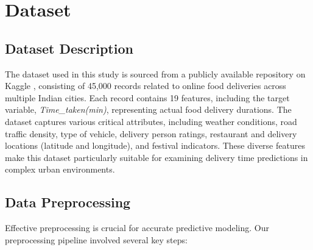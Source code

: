 \documentclass[10pt,twocolumn,letterpaper]{article}
\begin{document}
\section{Dataset}

\subsection{Dataset Description}
The dataset used in this study is sourced from a publicly available repository on Kaggle \cite{kaggle}, consisting of 45,000 records related to online food deliveries across multiple Indian cities. Each record contains 19 features, including the target variable, \textit{Time\_taken(min)}, representing actual food delivery durations. The dataset captures various critical attributes, including weather conditions, road traffic density, type of vehicle, delivery person ratings, restaurant and delivery locations (latitude and longitude), and festival indicators. These diverse features make this dataset particularly suitable for examining delivery time predictions in complex urban environments.

\subsection{Data Preprocessing}
Effective preprocessing is crucial for accurate predictive modeling. Our preprocessing pipeline involved several key steps:
\end{document}
